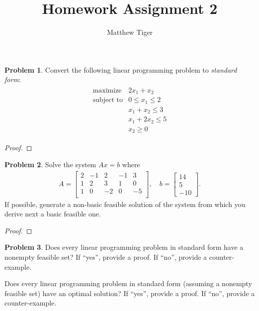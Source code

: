 \documentclass[12pt]{article}
\title{Homework Assignment 2}
\author{Matthew Tiger}
\theoremstyle{definition}
\newtheorem{problem}{Problem}
\begin{document}
\maketitle


\begin{problem}
  Convert the following linear programming problem to \textit{standard form}:
  \begin{align*}
    \begin{array}{ll}
      \text{maximize} & 2x_1 + x_2 \\
      \text{subject to} & 0 \leq x_1 \leq 2 \\
      & x_1 + x_2 \leq 3 \\
      & x_1 + 2x_2 \leq 5 \\
      & x_2 \geq 0
    \end{array}
  \end{align*}
\end{problem}

\begin{proof}
\end{proof}
\newpage


\begin{problem}
  Solve the system $Ax = b$ where
  \begin{align*}
    A =
    \begin{bmatrix}
      2 & -1 & 2 & -1 & 3 \\
      1 & 2 & 3 & 1 & 0 \\
      1 & 0 & -2 & 0 & -5 \\
    \end{bmatrix}
    , \quad
    b = \begin{bmatrix}
      14 \\
      5 \\
      -10
    \end{bmatrix}.
  \end{align*}
  If possible, generate a non-basic feasible solution of the system from which
  you derive next a basic feasible one.
\end{problem}

\begin{proof}
\end{proof}
\newpage


\begin{problem}
  Does every linear programming problem in standard form have a nonempty feasible set?
  If ``yes'', provide a proof. If ``no'', provide a counter-example.

  Does every linear programming problem in standard form (assuming a nonempty feasible
  set) have an optimal solution? If ``yes'', provide a proof. If ``no'', provide a counter-example.
\end{problem}
\end{document}
